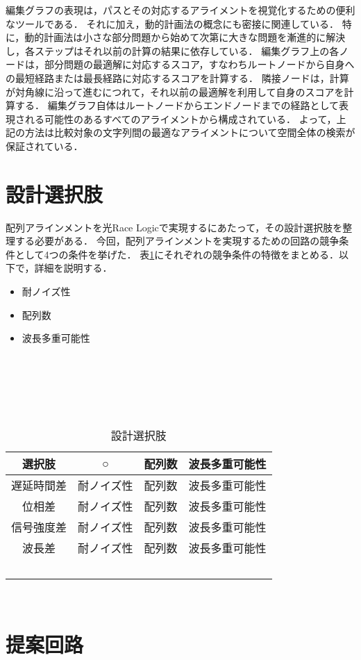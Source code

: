 編集グラフの表現は，パスとその対応するアライメントを視覚化するための便利なツールである．
それに加え，動的計画法の概念にも密接に関連している．
特に，動的計画法は小さな部分問題から始めて次第に大きな問題を漸進的に解決し，各ステップはそれ以前の計算の結果に依存している．
編集グラフ上の各ノードは，部分問題の最適解に対応するスコア，すなわちルートノードから自身への最短経路または最長経路に対応するスコアを計算する．
隣接ノードは，計算が対角線に沿って進むにつれて，それ以前の最適解を利用して自身のスコアを計算する．
編集グラフ自体はルートノードからエンドノードまでの経路として表現される可能性のあるすべてのアライメントから構成されている．
よって，上記の方法は比較対象の文字列間の最適なアライメントについて空間全体の検索が保証されている．

\section{設計選択肢}
配列アラインメントを光Race Logicで実現するにあたって，その設計選択肢を整理する必要がある．
今回，配列アラインメントを実現するための回路の競争条件として4つの条件を挙げた．
表\ref{tab:sentakushi}にそれぞれの競争条件の特徴をまとめる．以下で，詳細を説明する．

\begin{itemize}
\item 耐ノイズ性\\

\item 配列数\\

\item 波長多重可能性\\
\end{itemize}
\begin{table}[t]
        \begin{center}
        \caption{設計選択肢 }
        \begin{tabular}{|c|c|c|c|}\hline
選択肢&○&配列数&波長多重可能性 \\ \hline \hline
遅延時間差&耐ノイズ性&配列数&波長多重可能性 \\ \hline
位相差&耐ノイズ性&配列数&波長多重可能性 \\ \hline
信号強度差&耐ノイズ性&配列数&波長多重可能性 \\ \hline
波長差&耐ノイズ性&配列数&波長多重可能性 \\ \hline
        \end{tabular}
        \label{tab:sentakushi}
        \end{center}
\end{table}

\section{提案回路}
